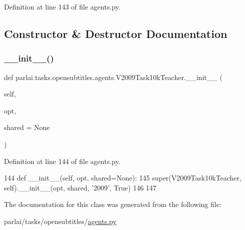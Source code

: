 Definition at line 143 of file agents.\+py.



\subsection{Constructor \& Destructor Documentation}
\mbox{\label{classparlai_1_1tasks_1_1opensubtitles_1_1agents_1_1V2009Task10kTeacher_af0a8a8e3a7a2c7b7cea42965f8b08afc}} 
\subsubsection{\texorpdfstring{\+\_\+\+\_\+init\+\_\+\+\_\+()}{\_\_init\_\_()}}
{\footnotesize\ttfamily def parlai.\+tasks.\+opensubtitles.\+agents.\+V2009\+Task10k\+Teacher.\+\_\+\+\_\+init\+\_\+\+\_\+ (\begin{DoxyParamCaption}\item[{}]{self,  }\item[{}]{opt,  }\item[{}]{shared = {\ttfamily None} }\end{DoxyParamCaption})}



Definition at line 144 of file agents.\+py.


\begin{DoxyCode}
144     \textcolor{keyword}{def }\_\_init\_\_(self, opt, shared=None):
145         super(V2009Task10kTeacher, self).\_\_init\_\_(opt, shared, \textcolor{stringliteral}{'2009'}, \textcolor{keyword}{True})
146 
147 
\end{DoxyCode}


The documentation for this class was generated from the following file\+:\begin{DoxyCompactItemize}
\item 
parlai/tasks/opensubtitles/\hyperlink{parlai_2tasks_2opensubtitles_2agents_8py}{agents.\+py}\end{DoxyCompactItemize}
